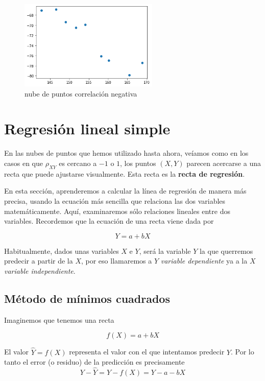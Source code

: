 \documentclass[]{book}
\theoremstyle{plain}
\theoremstyle{definition}
\begin{document}
\begin{itemize}
  \begin{figure}
  \centering
  \includegraphics[width=2.60417in,height=\textheight]{img/cloud_menos.png}
  \caption{nube de puntos correlación negativa}
  \end{figure}
\end{itemize}

\hypertarget{regresiuxf3n-lineal-simple}{%
\section{Regresión lineal simple}\label{regresiuxf3n-lineal-simple}}

En las nubes de puntos que hemos utilizado hasta ahora, veíamos como en
los casos en que \(\rho_{XY}\) es cercano a \(-1\) o \(1\), los puntos
\((X,Y)\) parecen acercarse a una recta que puede ajustarse visualmente.
Esta recta es la \textbf{recta de regresión}.

En esta sección, aprenderemos a calcular la línea de regresión de manera
más precisa, usando la ecuación más sencilla que relaciona las dos
variables matemáticamente. Aquí, examinaremos sólo relaciones lineales
entre dos variables. Recordemos que la ecuación de una recta viene dada
por

\[Y= a + b X \]

Habitualmente, dados unas variables \(X\) e \(Y\), será la variable
\(Y\) la que querremos predecir a partir de la \(X\), por eso llamaremos
a \(Y\) \emph{variable dependiente} ya a la \(X\) \emph{variable
independiente}.

\hypertarget{muxe9todo-de-muxednimos-cuadrados}{%
\subsection{Método de mínimos
cuadrados}\label{muxe9todo-de-muxednimos-cuadrados}}

Imaginemos que tenemos una recta

\[f(X)= a + b X\]

El valor \(\hat Y = f(X)\) representa el valor con el que intentamos
predecir \(Y\). Por lo tanto el error (o residuo) de la predicción es
precisamente \[Y- \hat Y = Y - f(X) = Y- a - b X\]
\end{document}
